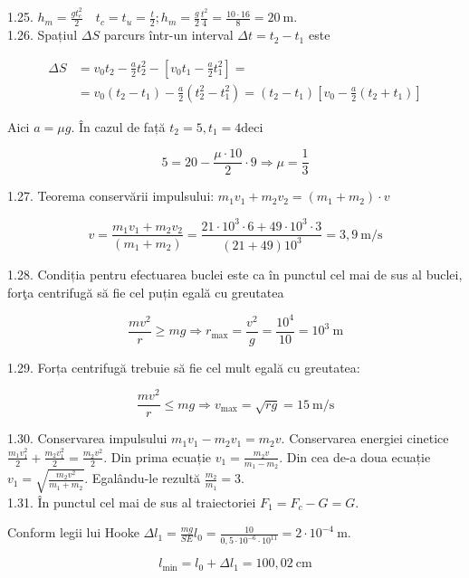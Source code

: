\documentclass[10pt]{article}
\begin{document}
1.25. $h_{m}=\frac{g t_{c}^{2}}{2} \quad t_{c}=t_{u}=\frac{t}{2} ; h_{m}=\frac{g}{2} \frac{t^{2}}{4}=\frac{10 \cdot 16}{8}=20 \mathrm{~m}$.\\
1.26. Spațiul $\Delta S$ parcurs într-un interval $\Delta t=t_{2}-t_{1}$ este

$$
\begin{aligned}
\Delta S & =v_{0} t_{2}-\frac{a}{2} t_{2}^{2}-\left[v_{0} t_{1}-\frac{a}{2} t_{1}^{2}\right]= \\
& =v_{0}\left(t_{2}-t_{1}\right)-\frac{a}{2}\left(t_{2}^{2}-t_{1}^{2}\right)=\left(t_{2}-t_{1}\right)\left[v_{0}-\frac{a}{2}\left(t_{2}+t_{1}\right)\right]
\end{aligned}
$$

Aici $a=\mu g$. În cazul de față $t_{2}=5, t_{1}=4 \mathrm{deci}$

$$
5=20-\frac{\mu \cdot 10}{2} \cdot 9 \Rightarrow \mu=\frac{1}{3}
$$

1.27. Teorema conservării impulsului: $m_{1} v_{1}+m_{2} v_{2}=\left(m_{1}+m_{2}\right) \cdot v$

$$
v=\frac{m_{1} v_{1}+m_{2} v_{2}}{\left(m_{1}+m_{2}\right)}=\frac{21 \cdot 10^{3} \cdot 6+49 \cdot 10^{3} \cdot 3}{(21+49) 10^{3}}=3,9 \mathrm{~m} / \mathrm{s}
$$

1.28. Condiția pentru efectuarea buclei este ca în punctul cel mai de sus al buclei, forţa centrifugă să fie cel puțin egală cu greutatea

$$
\frac{m v^{2}}{r} \geq m g \Rightarrow r_{\max }=\frac{v^{2}}{g}=\frac{10^{4}}{10}=10^{3} \mathrm{~m}
$$

1.29. Forța centrifugă trebuie să fie cel mult egală cu greutatea:

$$
\frac{m v^{2}}{r} \leq m g \Rightarrow v_{\max }=\sqrt{r g}=15 \mathrm{~m} / \mathrm{s}
$$

1.30. Conservarea impulsului $m_{1} v_{1}-m_{2} v_{1}=m_{2} v$. Conservarea energiei cinetice $\frac{m_{1} v_{1}^{2}}{2}+\frac{m_{2} v_{1}^{2}}{2}=\frac{m_{2} v^{2}}{2}$. Din prima ecuație $v_{1}=\frac{m_{2} v}{m_{1}-m_{2}}$. Din cea de-a doua ecuație $v_{1}=\sqrt{\frac{m_{2} v^{2}}{m_{1}+m_{2}}}$. Egalându-le rezultă $\frac{m_{2}}{m_{1}}=3$.\\
1.31. În punctul cel mai de sus al traiectoriei $F_{1}=F_{c}-G=G$.

Conform legii lui Hooke $\Delta l_{1}=\frac{m g}{S E} l_{0}=\frac{10}{0,5 \cdot 10^{-6} \cdot 10^{11}}=2 \cdot 10^{-4} \mathrm{~m}$.

$$
l_{\min }=l_{0}+\Delta l_{1}=100,02 \mathrm{~cm}
$$
\end{document}
